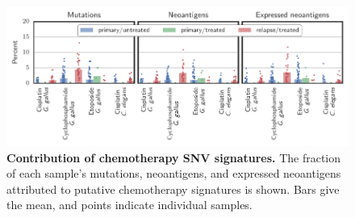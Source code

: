 \documentclass{article}
\begin{document}
\begin{figure}[htbp]
\centering
\includegraphics[scale=1.0]{../figures/sources_of_mutations_and_neoantigens_ungrouped.pdf}
\caption{\textbf{Contribution of chemotherapy SNV signatures.} The fraction of each sample's mutations, neoantigens, and expressed neoantigens attributed to putative chemotherapy signatures is shown. Bars give the mean, and points indicate individual samples.}
\label{fig:sourcesungrouped}
\end{figure}

\newpage
\FloatBarrier

 

\end{document}
